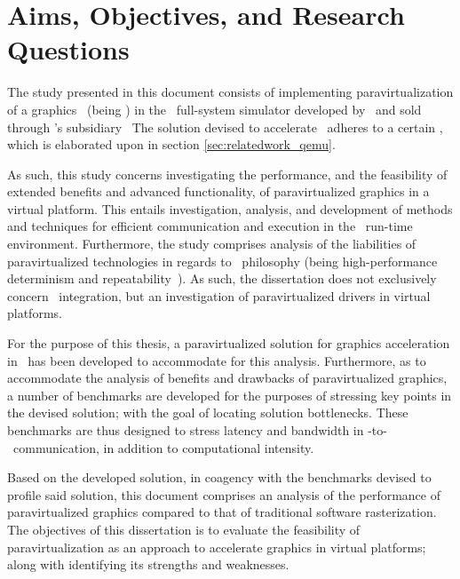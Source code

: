 
\chapter{Aims, Objectives, and Research Questions}
\label{cha:aimsandobjectives}
The study presented in this document consists of implementing paravirtualization of a graphics \dvttermapi\ (being \dvttermopenglestwopointo ) in the \dvttermsimics\ full-system simulator developed by \dvttermintel\ and sold through \dvttermintel 's subsidiary \dvttermwindriver\ 
The solution devised to accelerate \dvttermopengl\ adheres to a certain \dvttermreferencesolution , which is elaborated upon in section \ref{sec:relatedwork_qemu}.

As such, this study concerns investigating the performance, and the feasibility of extended benefits and advanced functionality, of paravirtualized graphics in a virtual platform.
This entails investigation, analysis, and development of methods and techniques for efficient communication and execution in the \dvttermsimics\ run-time environment.
Furthermore, the study comprises analysis of the liabilities of paravirtualized technologies in regards to \dvttermsimics\ philosophy (being high-performance determinism and repeatability~).
As such, the dissertation does not exclusively concern \dvttermsimics\ integration, but an investigation of paravirtualized drivers in virtual platforms.

For the purpose of this thesis, a paravirtualized solution for graphics acceleration in \dvttermsimics\ has been developed to accommodate for this analysis.
Furthermore, as to accommodate the analysis of benefits and drawbacks of paravirtualized graphics, a number of benchmarks are developed for the purposes of stressing key points in the devised solution; with the goal of locating solution bottlenecks.
These benchmarks are thus designed to stress latency and bandwidth in \dvttermtarget -to-\dvttermhost\ communication, in addition to computational intensity.

Based on the developed solution, in coagency with the benchmarks devised to profile said solution, this document comprises an analysis of the performance of paravirtualized graphics compared to that of traditional software rasterization.
The objectives of this dissertation is to evaluate the feasibility of paravirtualization as an approach to accelerate graphics in virtual platforms; along with identifying its strengths and weaknesses.\\

